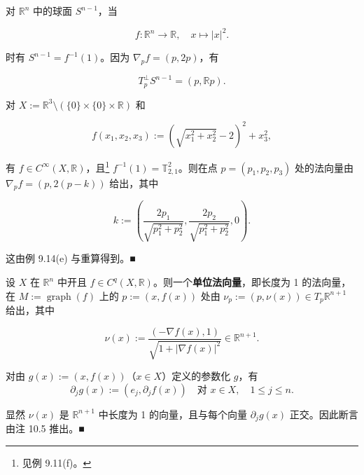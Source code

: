 \begin{example}

\begin{items}
\item

对 $ \mathbb{R}^{n} $ 中的球面 $ S^{n-1} $，当

\[
f : \mathbb{R}^{n} \to \mathbb{R} , \quad x \mapsto |x|^{2} .
\]

时有 $ S^{n-1} = f^{-1}(1) $。因为 $ \nabla_{p}f = (p, 2p) $，有

\[
T_{p}^{\perp}S^{n-1} = (p, \mathbb{R}p) .
\]
\end{items}


\begin{items}
\item[（b）]

对 $ X := \mathbb{R}^{3}\setminus\left(\{0\}\times\{0\}\times\mathbb{R}\right) $ 和

\[
f(x_{1},x_{2},x_{3}) := \left(\sqrt{x_{1}^{2} + x_{2}^{2}} - 2\right)^{2} + x_{3}^{2} ,
\]

有 $ f \in C^{\infty}(X,\mathbb{R}) $，且\footnote{见例 9.11(f)。} $ f^{-1}(1) = \mathbb{T}_{2,1}^{2} $。则在点 $ p = (p_{1},p_{2},p_{3}) $ 处的法向量由 $ \nabla_{p}f = (p, 2(p - k)) $ 给出，其中

\[
k := \left(\frac{2p_{1}}{\sqrt{p_{1}^{2} + p_{2}^{2}}}, \frac{2p_{2}}{\sqrt{p_{1}^{2} + p_{2}^{2}}}, 0\right) .
\]
\end{items}


\proofhead
这由例 9.14(e) 与重算得到。\nobreak\hspace{0.35em}■

\begin{items}
\item[（c）]

设 $ X $ 在 $ \mathbb{R}^{n} $ 中开且 $ f \in C^{q}(X,\mathbb{R}) $。则一个\textbf{单位法向量}，即长度为 1 的法向量，在 $ M := \operatorname{graph}(f) $ 上的 $ p := (x, f(x)) $ 处由 $ \nu_{p} := (p, \nu(x)) \in T_{p}\mathbb{R}^{n+1} $ 给出，其中

\[
\nu(x) := \frac{(-\nabla f(x), 1)}{\sqrt{1 + |\nabla f(x)|^{2}}} \in \mathbb{R}^{n+1} .
\]

\proofhead
对由 $ g(x) := (x, f(x)) $（$ x \in X $）定义的参数化 $ g $，有
\[
\partial_{j}g(x) := (e_{j}, \partial_{j}f(x)) \quad \text{对 } x \in X , \quad 1 \le j \le n .
\]

显然 $ \nu(x) $ 是 $ \mathbb{R}^{n+1} $ 中长度为 1 的向量，且与每个向量 $ \partial_{j}g(x) $ 正交。因此断言由注 10.5 推出。\nobreak\hspace{0.35em}■

\end{items}

\end{example}

